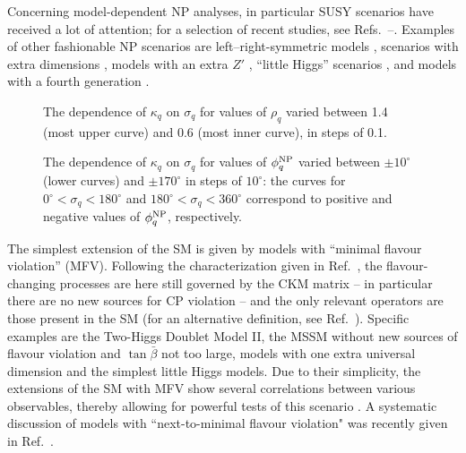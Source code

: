\documentclass[12pt]{article}
\begin{document}
Concerning model-dependent NP analyses, in particular SUSY
scenarios have received a lot of attention; for a selection of recent studies, see
Refs.~\cite{GOSST}--\cite{GHK}. Examples of other fashionable NP scenarios 
are left--right-symmetric models \cite{LR-sym}, scenarios with extra dimensions
\cite{extra-dim}, models with an extra $Z'$ \cite{Z-prime}, ``little Higgs'' 
scenarios \cite{little-higgs}, and models with a fourth generation \cite{hou-4}.


\begin{figure}
\centerline{
\textwidth{}
 }
 \vspace*{-0.3truecm}
\caption[]{The dependence of $\kappa_q$ on $\sigma_q$ for values of 
$\rho_q$ varied between 1.4 (most upper curve) and 0.6 (most inner curve),
in steps of 0.1.}\label{fig:kappa-rho}
\end{figure}


\begin{figure}
\centerline{
\textwidth{}
 }
 \vspace*{-0.3truecm}
\caption[]{The dependence of $\kappa_q$ on $\sigma_q$ for values of 
$\phi_q^{\rm NP}$ varied between $\pm10^\circ$ (lower curves) and 
$\pm170^\circ$ in steps of $10^\circ$: the curves for $0^\circ<\sigma_q<180^\circ$
and $180^\circ<\sigma_q<360^\circ$ correspond to positive and negative values
of $\phi_q^{\rm NP}$, respectively.}\label{fig:kappa-phi}
\end{figure}


The simplest extension of the SM is given by models with ``minimal flavour violation'' (MFV). Following the characterization given in Ref.~\cite{MFV-1}, 
the flavour-changing processes are here still governed by the CKM matrix -- in 
particular there are no new sources for CP violation --  and the only relevant 
operators are those present in the SM (for an alternative definition, see 
Ref.~\cite{MFV-2}). Specific examples are the Two-Higgs Doublet Model II,
the MSSM without new sources of flavour violation and $\tan\bar\beta$ not
too large, models with one extra universal dimension and the simplest
little Higgs models. Due to their simplicity, the extensions of the SM with
MFV show several correlations between various observables, 
thereby allowing for powerful tests of this scenario \cite{buras-MFV}. A 
systematic discussion of  models with ``next-to-minimal flavour violation" was 
recently given in Ref.~\cite{NMFV}.
\end{document}
